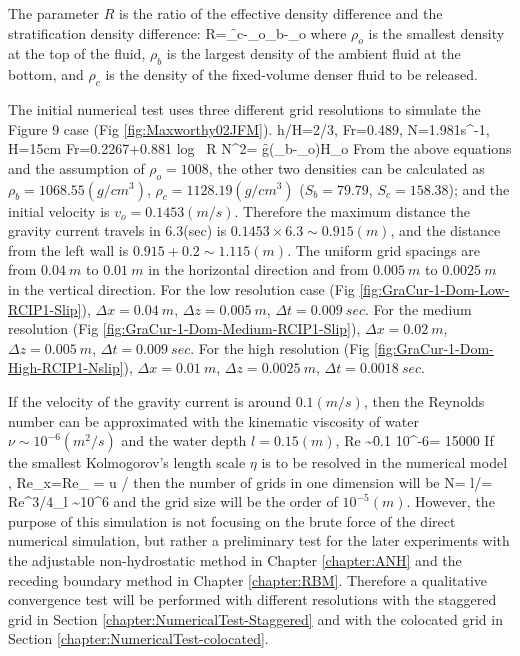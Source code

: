 The parameter $R$ is the ratio of the effective density difference and the stratification density difference:
\be
R=\f{\rho_c-\rho_o}{\rho_b-\rho_o}
\ee
where $\rho_o$ is the smallest density at the top of the fluid, $\rho_b$ is the largest density of the ambient fluid at the bottom, and $\rho_c$ is the density of the fixed-volume denser fluid to be released.

The initial numerical test uses three different grid resolutions to simulate the Figure 9 case (Fig \ref{fig:Maxworthy02JFM}).
\be
h/H=2/3, Fr=0.489, N=1.981s^{-1}, H=15cm
\ee
\be
Fr=0.2267+0.881 log \ R
\ee
\be
N^2= \f{g(\rho_b-\rho_o)}{H\rho_o}
\ee
From the above equations and the assumption of $\rho_o=1008$, the other two densities can be calculated as $\rho_b=1068.55(g/cm^3)$,  $\rho_c=1128.19(g/cm^3)$ ($S_b=79.79$, $S_c=158.38$); and the initial velocity is $v_o = 0.1453(m/s)$. Therefore the maximum distance the gravity current travels in 6.3(sec) is $0.1453 \times 6.3 \sim 0.915(m)$, and the distance from the left wall is $0.915 + 0.2 \sim 1.115(m)$. The uniform grid spacings are from $0.04 \ m$ to $0.01 \ m$ in the horizontal direction and from $0.005 \ m$ to $0.0025 \ m$ in the vertical direction. For the low resolution case (Fig \ref{fig:GraCur-1-Dom-Low-RCIP1-Slip}), $\Delta x = 0.04 \ m$, $\Delta z= 0.005 \ m$, $\Delta t= 0.009 \ sec$.
For the medium resolution (Fig \ref{fig:GraCur-1-Dom-Medium-RCIP1-Slip}), $\Delta x = 0.02 \ m$, $\Delta z= 0.005 \ m$, $\Delta t = 0.009 \ sec$. For the high resolution (Fig \ref{fig:GraCur-1-Dom-High-RCIP1-Nslip}), $\Delta x= 0.01 \ m$, $\Delta z= 0.0025 \ m$, $\Delta t= 0.0018 \ sec$.

If the velocity of the gravity current is around $0.1 (m/s)$, then the Reynolds number can be approximated with the kinematic viscosity of water $\nu \sim 10^{-6} (m^2/s)$ and the water depth $l=0.15 (m)$,
\be
Re \sim \f{0.1 }{10^{-6}}= 15000
\ee
If the smallest Kolmogorov's length scale $\eta$ is to be resolved in the numerical model \cite{Tennekes1972},
\be
Re_{\Delta x}=Re_{\eta} = u \eta/ 
\ee
then the number of grids in one dimension will be
\be
N= l/\eta = Re^{3/4}_l \sim 10^6 %
\ee
and the grid size will be the order of $10^{-5} (m)$. However, the purpose of this simulation is not focusing on the brute force of the direct numerical simulation, but rather a preliminary test for the later experiments with the adjustable non-hydrostatic method in Chapter \ref{chapter:ANH} and the receding boundary method in Chapter \ref{chapter:RBM}. Therefore a qualitative convergence test will be performed with different resolutions with the staggered grid in Section \ref{chapter:NumericalTest-Staggered} and with the colocated grid in Section \ref{chapter:NumericalTest-colocated}.

